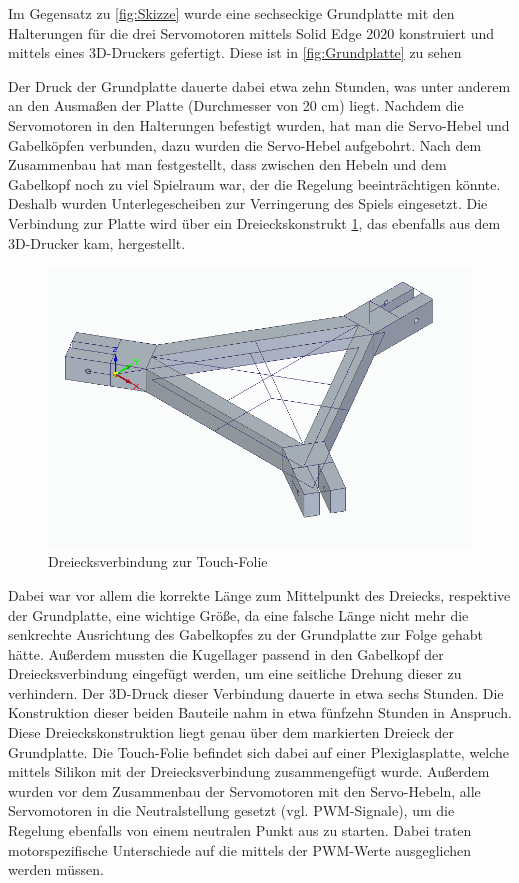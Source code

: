 \documentclass[12pt,a4paper,bibliography=totoc,listof=totoc]{scrartcl}
\begin{document}
Im Gegensatz zu \ref{fig:Skizze} wurde eine sechseckige Grundplatte mit den Halterungen für die drei 
Servomotoren mittels Solid Edge 2020 konstruiert und mittels eines 3D-Druckers gefertigt. Diese ist 
in \ref{fig:Grundplatte} zu sehen

Der Druck der Grundplatte dauerte dabei etwa zehn Stunden, was unter anderem an den Ausmaßen der Platte 
(Durchmesser von 20 cm) liegt. Nachdem die Servomotoren in den Halterungen befestigt wurden, hat man die 
Servo-Hebel und Gabelköpfen verbunden, dazu wurden die Servo-Hebel aufgebohrt. Nach dem Zusammenbau hat man 
festgestellt, dass zwischen den Hebeln und dem Gabelkopf noch zu viel Spielraum war, der die Regelung 
beeinträchtigen könnte. Deshalb wurden Unterlegescheiben zur Verringerung des Spiels eingesetzt. Die 
Verbindung zur Platte wird über ein Dreieckskonstrukt \ref{fig:Dreiecksverbindung}, das ebenfalls aus dem 
3D-Drucker kam, hergestellt. 

\begin{figure}[htbp]
	\centering
	\includegraphics[scale = 0.45]{pics/BildDreieck}
	\caption{Dreiecksverbindung zur Touch-Folie}
	\label{fig:Dreiecksverbindung}
\end{figure}

Dabei war vor allem die korrekte Länge zum Mittelpunkt des Dreiecks, 
respektive der Grundplatte, eine wichtige Größe, da eine falsche Länge nicht mehr die senkrechte 
Ausrichtung des Gabelkopfes zu der Grundplatte zur Folge gehabt hätte. Außerdem mussten die Kugellager 
passend in den Gabelkopf der Dreiecksverbindung eingefügt werden, um eine seitliche Drehung dieser zu 
verhindern.
Der 3D-Druck dieser Verbindung dauerte in etwa sechs Stunden. Die Konstruktion dieser beiden Bauteile 
nahm in etwa fünfzehn Stunden in Anspruch. Diese Dreieckskonstruktion liegt genau über dem markierten 
Dreieck der Grundplatte. Die Touch-Folie befindet sich dabei auf einer Plexiglasplatte, welche mittels 
Silikon mit der Dreiecksverbindung zusammengefügt wurde.
Außerdem wurden vor dem Zusammenbau der Servomotoren mit den Servo-Hebeln, alle Servomotoren in die 
Neutralstellung gesetzt (vgl. PWM-Signale), um die Regelung ebenfalls von einem neutralen Punkt aus zu 
starten. Dabei traten motorspezifische Unterschiede auf die mittels der PWM-Werte ausgeglichen werden 
müssen.
\end{document}
